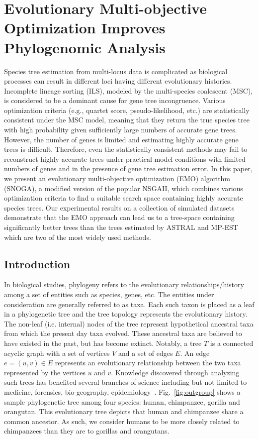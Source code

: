 \graphicspath{{snoga/}}
\chapter{Evolutionary Multi-objective Optimization Improves Phylogenomic Analysis} \label{ch:snoga}



	Species tree estimation from multi-locus data is complicated as biological processes can result in different loci having different evolutionary histories. Incomplete lineage sorting (ILS), modeled by the multi-species coalescent (MSC), is considered to be a dominant cause for gene tree incongruence. Various optimization criteria (e.g., quartet score, pseudo-likelihood, etc.) are statistically consistent under the MSC model, meaning that they return the true species tree with high probability given sufficiently large numbers of accurate gene trees. However, the number of genes is limited and estimating highly accurate gene trees is difficult. Therefore, even the statistically consistent methods may fail to reconstruct highly accurate trees under practical model conditions with limited numbers of genes and in the presence of gene tree estimation error. In this paper, we present an evolutionary multi-objective optimization (EMO) algorithm (SNOGA), a modified version of the popular NSGAII, which combines various optimization criteria to find a suitable search space containing highly accurate species trees. Our experimental results on a collection of simulated datasets demonstrate that the EMO approach can lead us to a tree-space containing significantly better trees than the trees estimated by ASTRAL and MP-EST which are two of the most widely used methods. 

 \section{Introduction}
\label{sec:intro}
In biological studies, phylogeny refers to the evolutionary relationships/history among a set of entities such as species, genes, etc. The entities under consideration are generally referred to as taxa. Each such taxon is placed as a leaf in a phylogenetic tree and the tree topology represents the evolutionary history. The non-leaf (i.e. internal) nodes of the tree represent hypothetical ancestral taxa from which the present day taxa evolved. These ancestral taxa are believed to have existed in the past, but has become extinct. Notably, a tree $T$ is a connected acyclic graph with a set of vertices $V$ and a set of edges $E$. An edge $e = (u, v) \in E$ represents an evolutionary relationship between the two taxa represented by the vertices $u$ and $v$. Knowledge discovered through analyzing such trees has benefited several branches of science including but not limited to medicine, forensics, bio-geography, epidemiology~\cite{felix2015phylogenetics}. 
Fig.~\ref{fig:outgroup} shows a sample phylogenetic tree among four species: human, chimpanzee, gorilla and orangutan. This evolutionary tree depicts that human and chimpanzee share a common ancestor. As such, we consider humans to be more closely related to chimpanzees than they are to gorillas and orangutans.

